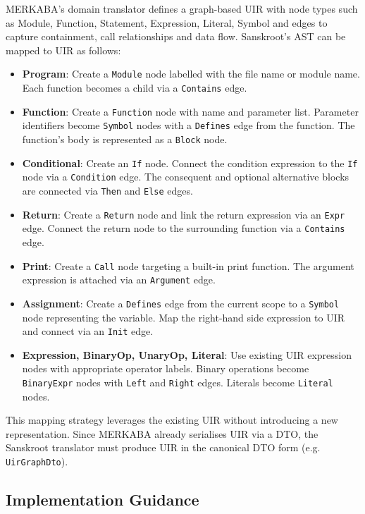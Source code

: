 \documentclass[12pt]{article}
\begin{document}
MERKABA’s domain translator defines a graph-based UIR with node types such
as Module, Function, Statement, Expression, Literal, Symbol and edges to
capture containment, call relationships and data flow.  Sanskroot’s AST can
be mapped to UIR as follows:

\begin{itemize}
  \item \textbf{Program}: Create a \texttt{Module} node labelled with the
    file name or module name.  Each function becomes a child via a
    \texttt{Contains} edge.
  \item \textbf{Function}: Create a \texttt{Function} node with name and
    parameter list.  Parameter identifiers become \texttt{Symbol} nodes with
    a \texttt{Defines} edge from the function.  The function’s body is
    represented as a \texttt{Block} node.
  \item \textbf{Conditional}: Create an \texttt{If} node.  Connect the
    condition expression to the \texttt{If} node via a \texttt{Condition}
    edge.  The consequent and optional alternative blocks are connected via
    \texttt{Then} and \texttt{Else} edges.
  \item \textbf{Return}: Create a \texttt{Return} node and link the return
    expression via an \texttt{Expr} edge.  Connect the return node to the
    surrounding function via a \texttt{Contains} edge.
  \item \textbf{Print}: Create a \texttt{Call} node targeting a built-in
    print function.  The argument expression is attached via an
    \texttt{Argument} edge.
  \item \textbf{Assignment}: Create a \texttt{Defines} edge from the current
    scope to a \texttt{Symbol} node representing the variable.  Map the
    right-hand side expression to UIR and connect via an \texttt{Init}
    edge.
  \item \textbf{Expression, BinaryOp, UnaryOp, Literal}: Use existing UIR
    expression nodes with appropriate operator labels.  Binary operations
    become \texttt{BinaryExpr} nodes with \texttt{Left} and \texttt{Right}
    edges.  Literals become \texttt{Literal} nodes.
\end{itemize}

This mapping strategy leverages the existing UIR without introducing a new
representation.  Since MERKABA already serialises UIR via a DTO, the
Sanskroot translator must produce UIR in the canonical DTO form (e.g.
\texttt{UirGraphDto}).

\subsection{Implementation Guidance}
\end{document}
